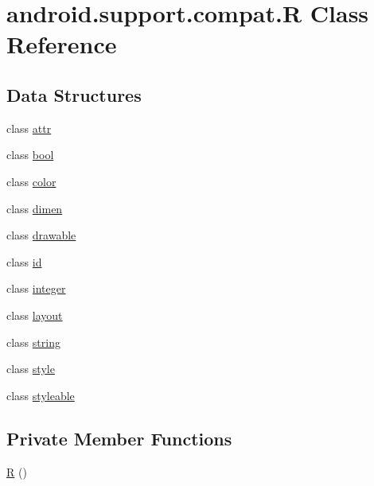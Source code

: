 \hypertarget{classandroid_1_1support_1_1compat_1_1_r}{}\section{android.\+support.\+compat.\+R Class Reference}
\label{classandroid_1_1support_1_1compat_1_1_r}
\subsection*{Data Structures}
\begin{DoxyCompactItemize}
\item 
class \mbox{\hyperlink{classandroid_1_1support_1_1compat_1_1_r_1_1attr}{attr}}
\item 
class \mbox{\hyperlink{classandroid_1_1support_1_1compat_1_1_r_1_1bool}{bool}}
\item 
class \mbox{\hyperlink{classandroid_1_1support_1_1compat_1_1_r_1_1color}{color}}
\item 
class \mbox{\hyperlink{classandroid_1_1support_1_1compat_1_1_r_1_1dimen}{dimen}}
\item 
class \mbox{\hyperlink{classandroid_1_1support_1_1compat_1_1_r_1_1drawable}{drawable}}
\item 
class \mbox{\hyperlink{classandroid_1_1support_1_1compat_1_1_r_1_1id}{id}}
\item 
class \mbox{\hyperlink{classandroid_1_1support_1_1compat_1_1_r_1_1integer}{integer}}
\item 
class \mbox{\hyperlink{classandroid_1_1support_1_1compat_1_1_r_1_1layout}{layout}}
\item 
class \mbox{\hyperlink{classandroid_1_1support_1_1compat_1_1_r_1_1string}{string}}
\item 
class \mbox{\hyperlink{classandroid_1_1support_1_1compat_1_1_r_1_1style}{style}}
\item 
class \mbox{\hyperlink{classandroid_1_1support_1_1compat_1_1_r_1_1styleable}{styleable}}
\end{DoxyCompactItemize}
\subsection*{Private Member Functions}
\begin{DoxyCompactItemize}
\item 
\mbox{\hyperlink{classandroid_1_1support_1_1compat_1_1_r_a5ccf4b4efeb034ade53739f6a3deee4d}{R}} ()
\end{DoxyCompactItemize}


